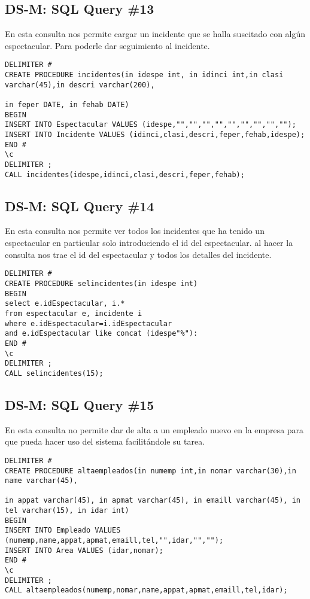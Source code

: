\subsection{DS-M: SQL Query \#13}
En esta consulta nos permite cargar un incidente que se halla suscitado con algún espectacular. Para poderle dar seguimiento al incidente. 
\begin{verbatim}
DELIMITER #
CREATE PROCEDURE incidentes(in idespe int, in idinci int,in clasi varchar(45),in descri varchar(200),

in feper DATE, in fehab DATE)
BEGIN
INSERT INTO Espectacular VALUES (idespe,"","","","","","","","","");
INSERT INTO Incidente VALUES (idinci,clasi,descri,feper,fehab,idespe);
END #
\c 
DELIMITER ;
CALL incidentes(idespe,idinci,clasi,descri,feper,fehab);

\end{verbatim}


\subsection{DS-M: SQL Query \#14}
En esta consulta nos permite ver todos los incidentes que ha tenido un espectacular en particular solo introduciendo el id del espectacular.
al hacer la consulta nos trae el id del espectacular y todos los detalles del incidente.
\begin{verbatim}
DELIMITER #
CREATE PROCEDURE selincidentes(in idespe int)
BEGIN
select e.idEspectacular, i.*
from espectacular e, incidente i
where e.idEspectacular=i.idEspectacular
and e.idEspectacular like concat (idespe"%"):
END #
\c 
DELIMITER ;
CALL selincidentes(15);
\end{verbatim}


\subsection{DS-M: SQL Query \#15}
En esta consulta no permite dar de alta a un empleado nuevo en la empresa para que pueda hacer uso del sistema facilitándole su tarea.
\begin{verbatim}
DELIMITER #
CREATE PROCEDURE altaempleados(in numemp int,in nomar varchar(30),in name varchar(45), 

in appat varchar(45), in apmat varchar(45), in emaill varchar(45), in tel varchar(15), in idar int)
BEGIN
INSERT INTO Empleado VALUES (numemp,name,appat,apmat,emaill,tel,"",idar,"","");
INSERT INTO Area VALUES (idar,nomar);
END #
\c 
DELIMITER ;
CALL altaempleados(numemp,nomar,name,appat,apmat,emaill,tel,idar);
\end{verbatim}


